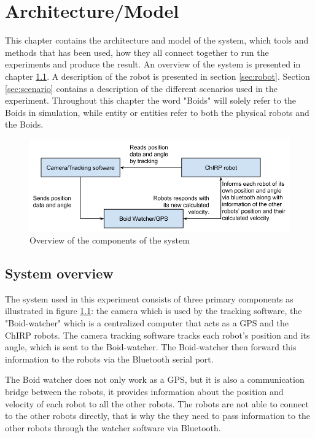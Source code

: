 \chapter{Architecture/Model}
\label{cha:architectureAndModel}
This chapter contains the architecture and model of the system, which tools and methods that has been used, how they all connect together to run the experiments and produce the result.
An overview of the system is presented in chapter \ref{sec:overview}. A description of the robot is presented in section \ref{sec:robot}. Section \ref{sec:scenario} contains a description of the different scenarios used in the experiment. Throughout this chapter the word "Boids" will solely refer to the Boids in simulation, while entity or entities refer to both the physical robots and the Boids.

\begin{figure}[h]
\begin{center}
\includegraphics[width=\linewidth]{figs/system_overview}
\end{center}
\caption[System overview]{Overview of the components of the system}
\label{fig:overview}
\end{figure}

\section{System overview}
\label{sec:overview}

The system used in this experiment consists of three primary components as illustrated in figure \ref{fig:overview}: the camera which is used by the tracking software, the "Boid-watcher" which is a centralized computer that acts as a GPS and the ChIRP robots.
The camera tracking software tracks each robot's position and its angle, which is sent to the Boid-watcher. The Boid-watcher then forward this information to the robots via the Bluetooth serial port.

The Boid watcher does not only work as a GPS, but it is also a communication bridge between the robots, it provides information about the position and velocity of each robot to all the other robots. The robots are not able to connect to the other robots directly, that is why the they need to pass information to the other robots through the watcher software via Bluetooth.

